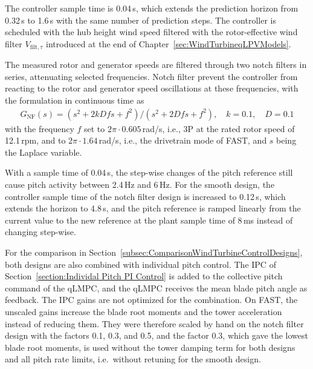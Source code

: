 %
%
The controller sample time is 0.04\,s, which extends the prediction horizon from 0.32\,s to 1.6\,s with the same number of prediction steps. The controller is scheduled with the hub height wind speed filtered with the rotor-effective wind filter $V_{\text{filt},\tau}$ introduced at the end of Chapter~\ref{sec:WindTurbineqLPVModels}.


The measured rotor and generator speeds are filtered through two notch filters in series, attenuating selected frequencies. Notch filter prevent the controller from reacting to the rotor and generator speed oscillations at these frequencies, with the formulation in continuous time as
\begin{align*}
    G_\text{NF}(s) = (s^2 + 2kDfs + f^2)/(s^2 + 2Dfs + f^2), \quad k = 0.1, \quad D = 0.1
\end{align*}
with the frequency $f$  set to $2\pi \cdot 0.605$\,rad/s, i.e., 3P at the rated rotor speed of 12.1\,rpm, and to $2\pi \cdot 1.64$\,rad/s, i.e., the drivetrain mode of FAST, and $s$ being the Laplace variable.



With a sample time of 0.04\,s, the step-wise changes of the pitch reference still cause pitch activity between 2.4\,Hz and 6\,Hz. For the smooth design, the controller sample time of the notch filter design is increased to 0.12\,s, which extends the horizon to 4.8\,s, and the pitch reference is ramped linearly from the current value to the new reference at the plant sample time of 8\,ms instead of changing step-wise.

For the comparison in Section~\ref{subsec:ComparisonWindTurbineControlDesigns}, both designs are also combined with individual pitch control. The IPC of Section~\ref{section:Individal Pitch PI Control} is added to the collective pitch command of the qLMPC, and the qLMPC receives the mean blade pitch angle as feedback. The IPC gains are not optimized for the combination. On FAST, the unscaled gains increase the blade root moments and the tower acceleration instead of reducing them. They were therefore scaled by hand on the notch filter design with the factors 0.1, 0.3, and 0.5, and the factor 0.3, which gave the lowest blade root moments, is used without the tower damping term for both designs and all pitch rate limits, i.e.\ without retuning for the smooth design.

